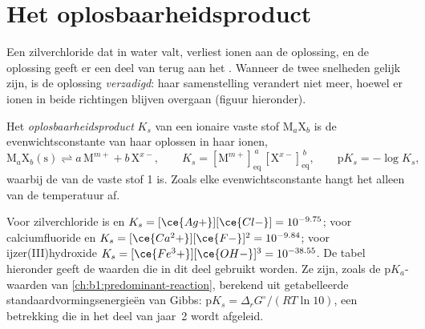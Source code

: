 \section{Het oplosbaarheidsproduct}\label{sec:b1:precipitation:product}

Een  zilverchloride dat in water valt, verliest ionen aan de
oplossing, en de oplossing geeft er een deel van terug aan het .
Wanneer de twee snelheden gelijk zijn, is de oplossing \emph{verzadigd}:
haar samenstelling verandert niet meer, hoewel er ionen in beide
richtingen blijven overgaan (figuur hieronder).

\begin{definition}[Oplosbaarheidsproduct]\label{def:b1:precipitation:solubility-product}
Het \emph{oplosbaarheidsproduct} $K_s$ van
een ionaire vaste stof $\mathrm{M}_a\mathrm{X}_b$ is de
evenwichtsconstante van haar oplossen in haar ionen,
\[
  \mathrm{M}_a\mathrm{X}_b\mathrm{(s)} \rightleftharpoons a\,\mathrm{M}^{m+}
  + b\,\mathrm{X}^{x-}, \qquad
  K_s = [\mathrm{M}^{m+}]_{\mathrm{eq}}^{\,a}\,[\mathrm{X}^{x-}]_{\mathrm{eq}}^{\,b},
  \qquad \mathrm{p}K_s = -\log K_s ,
\]
waarbij de  van de vaste stof 1 is. Zoals elke
evenwichtsconstante hangt het alleen van de temperatuur af.
\end{definition}

Voor zilverchloride is  en $K_s =
[\ce{Ag+}][\ce{Cl-}] = 10^{-9.75}$; voor calciumfluoride  en $K_s = [\ce{Ca^2+}][\ce{F-}]^2 = 10^{-9.84}$; voor
ijzer(III)hydroxide $K_s = [\ce{Fe^3+}][\ce{OH-}]^3 = 10^{-38.55}$.
De tabel hieronder geeft de waarden die in dit deel gebruikt worden.
Ze zijn, zoals de $\mathrm{p}K_a$-waarden van
\cref{ch:b1:predominant-reaction}, berekend uit getabelleerde
standaardvormingsenergieën van Gibbs: $\mathrm{p}K_s = \Delta_r G^\circ/(RT\ln 10)$,
een betrekking die in het deel van jaar~2 wordt afgeleid.


